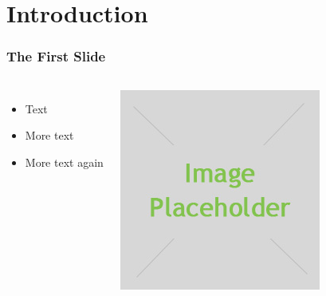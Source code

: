 

\maketitle

\section{Introduction}

\begin{frame} 
\frametitle{The First Slide}
\begin{columns}[c] 
\begin{itemize}
 \item Text
 \item More text
 \item More text again
\end{itemize}
\begin{center}
  \includegraphics[width=1\textwidth]{images/placeholder.jpg}
\end{center}
\end{columns}
\end{frame}

